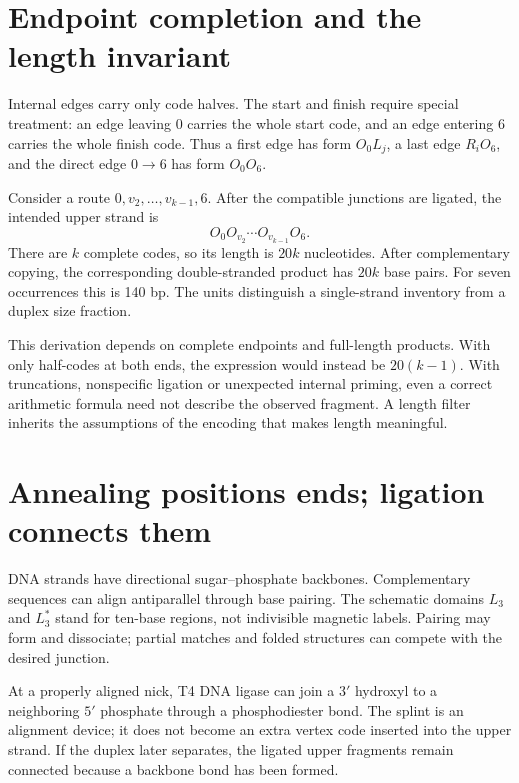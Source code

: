 \section{Endpoint completion and the length invariant}
Internal edges carry only code halves. The start and finish require special treatment: an edge leaving 0 carries the whole start code, and an edge entering 6 carries the whole finish code. Thus a first edge has form $O_0L_j$, a last edge $R_iO_6$, and the direct edge $0\to6$ has form $O_0O_6$.

Consider a route $0,v_2,\ldots,v_{k-1},6$. After the compatible junctions are ligated, the intended upper strand is
\[
O_0O_{v_2}\cdots O_{v_{k-1}}O_6.
\]
There are $k$ complete codes, so its length is $20k$ nucleotides. After complementary copying, the corresponding double-stranded product has $20k$ base pairs. For seven occurrences this is 140 bp. The units distinguish a single-strand inventory from a duplex size fraction.

This derivation depends on complete endpoints and full-length products. With only half-codes at both ends, the expression would instead be $20(k-1)$. With truncations, nonspecific ligation or unexpected internal priming, even a correct arithmetic formula need not describe the observed fragment. A length filter inherits the assumptions of the encoding that makes length meaningful.

\section{Annealing positions ends; ligation connects them}
DNA strands have directional sugar--phosphate backbones. Complementary sequences can align antiparallel through base pairing.\cite{dna} The schematic domains $L_3$ and $L_3^*$ stand for ten-base regions, not indivisible magnetic labels. Pairing may form and dissociate; partial matches and folded structures can compete with the desired junction.


At a properly aligned nick, T4 DNA ligase can join a $3'$ hydroxyl to a neighboring $5'$ phosphate through a phosphodiester bond.\cite{ligase} The splint is an alignment device; it does not become an extra vertex code inserted into the upper strand. If the duplex later separates, the ligated upper fragments remain connected because a backbone bond has been formed.

